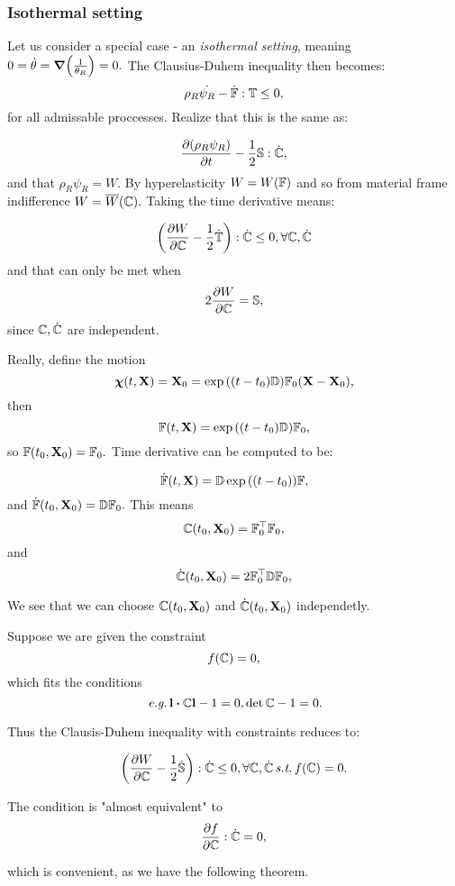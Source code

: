 \documentclass[11pt]{scrartcl} %
\begin{document}
\subsubsection{Isothermal setting}
\label{sec:isothermal}
Let us consider a special case - an \textit{isothermal setting}, meaning $0 = \dot{\theta} = \grad\qty(\frac{1}{\theta_R}) = 0.$ The Clausius-Duhem inequality then becomes:
\[
	\rho_R \dot{\psi_R} - \dot{\mathbb{F}} : \mathbb{T} \leq 0,
\]
for all admissable proccesses. Realize that this is the same as:

\[
	\pdv{\qty(\rho_R \psi_R)}{t} - \frac{1}{2}\mathbb{S}:\dot{\mathbb{C}},
\]
and that $\rho_R \psi_R = W.$ By hyperelasticity $W = W\qty(\mathbb{F})$ and so from material frame indifference $W = \overline{W}\qty(\mathbb{C}).$ Taking the time derivative means:

\[
	\qty(\pdv{W}{\ensuremath{\mathbb{C}}}-\frac{1}{2}\dot{\mathbb{T}}):\dot{\mathbb{C}} \leq 0, \forall \mathbb{C}, \dot{\mathbb{C}}
\]
and that can only be met when
\[
	2 \pdv{W}{\ensuremath{\mathbb{C}}} = \mathbb{S},
\]
since $\mathbb{C}, \dot{\mathbb{C}}$ are independent.

Really, define the motion
\[
	\vb*{\chi}\qty(t,\vb{X}) = \vb{X}_0 = \exp\qty(\qty(t-t_0)\mathbb{D}) \mathbb{F}_0\qty(\vb{X}-\vb{X}_0),
\]
then
\[
	\mathbb{F}\qty(t,\vb{X}) = \exp\qty(\qty(t-t_0)\mathbb{D})\mathbb{F}_0,
\]
so $\mathbb{F}\qty(t_0, \vb{X}_0) = \mathbb{F}_0.$ Time derivative can be computed to be:

\[
	\dot{\mathbb{F}} \qty(t,\vb{X})= \mathbb{D} \exp\qty(\qty(t-t_0))\mathbb{F},
\]
and $\dot{\mathbb{F}}\qty(t_0, \vb{X}_0) = \mathbb{D}\mathbb{F}_0.$ This means
\[
	\mathbb{C}\qty(t_0, \vb{X}_0) = \mathbb{F}_0^\top\mathbb{F}_0,
\]
and
\[
	\dot{\mathbb{C}}\qty(t_0, \vb{X}_0) = 2 \mathbb{F}_0^\top \mathbb{D} \mathbb{F}_0,
\]

We see that we can choose $\mathbb{C}\qty(t_0, \vb{X}_0)$ and $\dot{\mathbb{C}}\qty(t_0, \vb{X}_0)$ independetly.

Suppose we are given the constraint
\[
	f\qty(\mathbb{C}) = 0,
\]
which fits the conditions
\[
	\, \text{\textit{e.g.}} \,\vb{l}\vdot \rcg \vb{l}-1 = 0, \det \rcg -1 =0.
\]

Thus the Clausis-Duhem inequality with constraints reduces to:
\begin{tcolorbox}
\begin{equation}
	\label{eq:constraint_CD}
	\qty(\pdv{W}{\ensuremath{\mathbb{C}}}- \frac{1}{2}\dot{\mathbb{S}}): \dot{\mathbb{C}} \leq 0, \forall \mathbb{C}, \dot{\mathbb{C}} \, \text{\textit{s.t.}} \, f\qty(\mathbb{C})=0.
\end{equation}

The condition is "almost equivalent" to
\[
	\pdv{f}{\ensuremath{\mathbb{C}}}:\dot{\mathbb{C}} = 0,
\]
\end{tcolorbox}
which is convenient, as we have the following theorem.
\end{document}
